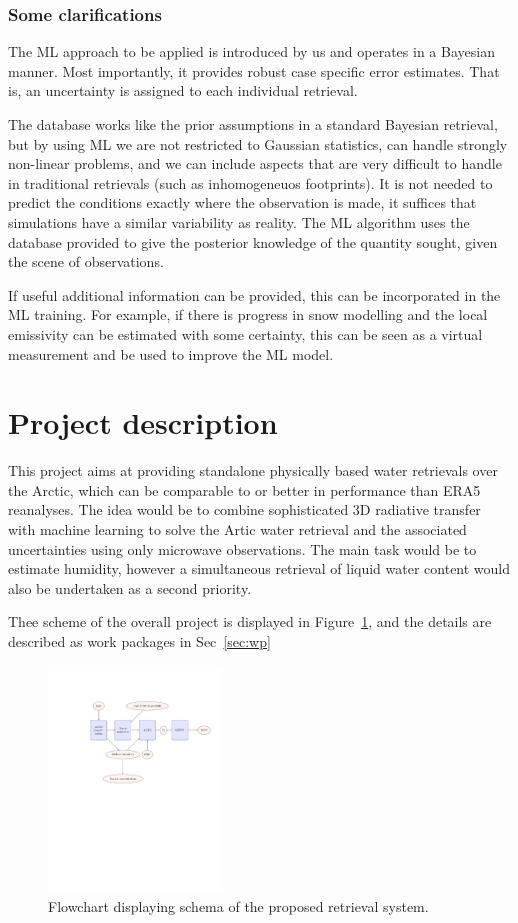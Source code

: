 \documentclass[12pt,oneside,a4paper]{article}
\begin{document}
\subsubsection{Some clarifications}

The ML approach to be applied is introduced by us and operates in a Bayesian
manner. Most importantly, it provides robust case specific error estimates.
That is, an uncertainty is assigned to each individual retrieval.

The database works like the prior assumptions in a standard Bayesian retrieval,
but by using ML we are not restricted to Gaussian statistics, can handle
strongly non-linear problems, and we can include aspects that are very
difficult to handle in traditional retrievals (such as inhomogeneuos
footprints). It is not needed to predict the conditions exactly where the
observation is made, it suffices that simulations have a similar variability as
reality. The ML algorithm uses the database provided to give the posterior
knowledge of the quantity sought, given the scene of observations.

If useful additional information can be provided, this can be incorporated in
the ML training. For example, if there is progress in snow modelling and the
local emissivity can be estimated with some certainty, this can be seen as a
virtual measurement and be used to improve the ML model.



\section{Project description}
%
This project aims at providing standalone physically based water retrievals over the Arctic, which can be comparable to or better in performance than ERA5 reanalyses. The idea would be to combine sophisticated 3D radiative transfer with machine learning to solve the Artic water retrieval and the associated uncertainties using only microwave observations. The main task would be to estimate humidity, however a simultaneous retrieval of liquid water content would also be undertaken as a second priority. 

Thee scheme of the overall project is displayed in Figure~\ref{fig:flowchart}, and the details are described as work packages in Sec~\ref{sec:wp} 

\begin{figure}[t]
	\centering
	\includegraphics[trim=140 370 40 125,clip,height = 60mm]{flowchart.pdf} 
	\caption{Flowchart displaying schema of the proposed retrieval system.}
	\label{fig:flowchart}
\end{figure}
\end{document}
